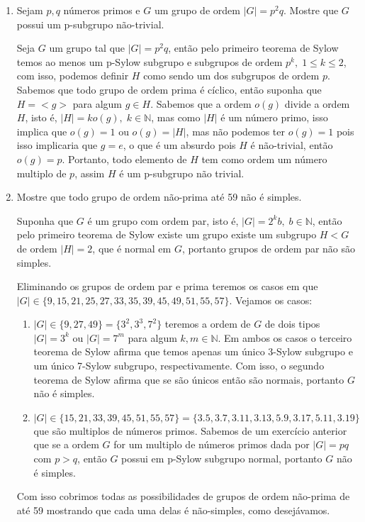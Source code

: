 \documentclass{article}
\begin{document}
\begin{enumerate}
		\item Sejam $p,q$ números primos e $G$ um grupo de ordem $|G| = p^{2}q$. Mostre que $G$ possui um p-subgrupo não-trivial.
		
		Seja $G$ um grupo tal que $|G| = p^{2}q$, então pelo primeiro teorema de Sylow temos ao menos um p-Sylow subgrupo e subgrupos de ordem $p^{k}, \; 1 \leq k \leq 2$, com isso, podemos definir $H$ como sendo um dos subgrupos de ordem $p$. Sabemos que todo grupo de ordem prima é cíclico, então suponha que $H = <g>$ para algum $g \in H$. Sabemos que a ordem $o(g)$ divide a ordem $H$, isto é, $|H| = ko(g), \; k \in \mathbb{N}$, mas como $|H|$ é um número primo, isso implica que $o(g) = 1$ ou $o(g) = |H|$, mas não podemos ter $o(g) = 1$ pois isso implicaria que $g = e$, o que é um absurdo pois $H$ é não-trivial, então $o(g) = p$. Portanto, todo elemento de $H$ tem como ordem um número multiplo de $p$, assim $H$ é um p-subgrupo não trivial.
		
		\item Mostre que todo grupo de ordem não-prima até 59 não é simples.
		
		Suponha que $G$ é um grupo com ordem par, isto é, $|G| = 2^{k}b, \; b \in \mathbb{N}$, então pelo primeiro teorema de Sylow existe um grupo existe um subgrupo $H < G$ de ordem $|H| = 2$, que é normal em $G$, portanto grupos de ordem par não são simples. 
		
		Eliminando os grupos de ordem par e prima teremos os casos em que $|G| \in \{9, 15, 21, 25, 27, 33, 35, 39, 45, 49, 51, 55, 57\}$. Vejamos os casos:
		\begin{enumerate}
			\item $|G| \in \{9, 27, 49\}= \{3^{2}, 3^{3}, 7^{2}\}$ teremos a ordem de $G$ de dois tipos $|G| =3^{k}$ ou $|G| =7^{m}$ para algum $k,m \in \mathbb{N}$. Em ambos os casos o terceiro teorema de Sylow afirma que temos apenas um único 3-Sylow subgrupo e um único 7-Sylow subgrupo, respectivamente. Com isso, o segundo teorema de Sylow afirma que se são únicos então são normais, portanto $G$ não é simples.
			
			\item $|G| \in \{15, 21, 33, 39, 45, 51, 55, 57\}= \{3.5, 3.7, 3.11, 3.13, 5.9, 3.17, 5.11, 3.19\}$ que são multiplos de números primos. Sabemos de um exercício anterior que se a ordem $G$ for um multiplo de números primos dada por $|G| = pq$ com $p>q$, então $G$ possui em p-Sylow subgrupo normal, portanto $G$ não é simples.
		\end{enumerate}
		
		Com isso cobrimos todas as possibilidades de grupos de ordem não-prima de até 59 mostrando que cada uma delas é não-simples, como desejávamos.
		
	\end{enumerate}
	
	
\end{document}
